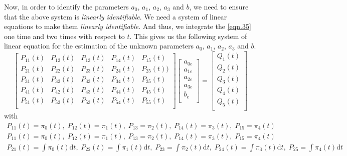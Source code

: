 \documentclass{article}
\begin{document}
\par Now, in order to identify the parameters $a_{0}$, $a_{1}$, $a_{2}$, $a_{3}$ and $b$, we need to ensure that the above system is \textit{linearly identifiable}. We need a system of linear equations to make them \textit{linearly identifiable}. And thus, we integrate the \eqref{eqn.35} one time and two times with respect to $t$. This gives us the following system of linear equation for the estimation of the unknown parameters $a_{0}$, $a_{1}$, $a_{2}$, $a_{3}$ and $b$.
\begin{equation}\label{eqn:98}
\begin{bmatrix}
P_{11}(t) & P_{12}(t) & P_{13}(t) & P_{14}(t) & P_{15}(t) \\
P_{21}(t) & P_{22}(t) & P_{23}(t) & P_{24}(t) & P_{25}(t)) \\
P_{31}(t) & P_{32}(t) & P_{33}(t) & P_{34}(t) & P_{35}(t) \\
P_{41}(t) & P_{42}(t) & P_{43}(t) & P_{44}(t) & P_{45}(t) \\
P_{51}(t) & P_{52}(t) & P_{53}(t) & P_{54}(t) & P_{55}(t) \\
\end{bmatrix}
\begin{bmatrix}
a_{0e} \\
a_{1e} \\
a_{2e} \\
a_{3e} \\
b_{e} \\
\end{bmatrix}
= 
\begin{bmatrix}
Q_{1}(t) \\
Q_{2}(t) \\
Q_{3}(t) \\
Q_{4}(t) \\
Q_{5}(t) \\
\end{bmatrix}
\end{equation}
with 
\begin{align*}
P_{11}(t) = \pi_{0}(t), \; P_{12}(t) = \pi_{1}(t), \; P_{13} = \pi_{2}(t), \; P_{14}(t) = \pi_{3}(t), \; P_{15} = \pi_{4}(t)
\end{align*}
\begin{align*}
P_{11}(t) = \pi_{0}(t), \; P_{12}(t) = \pi_{1}(t), \; P_{13} = \pi_{2}(t), \; P_{14}(t) = \pi_{3}(t), \; P_{15} = \pi_{4}(t)
\end{align*}
\begin{align*}
P_{21}(t) = \int \pi_{0}(t) \mathrm{d}t, \; P_{22}(t) = \int \pi_{1}(t) \mathrm{d}t, \; P_{23} = \int \pi_{2}(t) \mathrm{d}t, \; P_{24}(t) = \int \pi_{3}(t) \mathrm{d}t, \; P_{25} = \int \pi_{4}(t) \mathrm{d}t
\end{align*}
\end{document}
